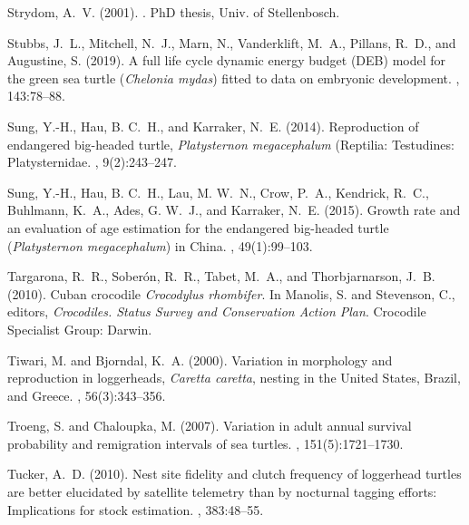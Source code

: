 \documentclass{article}
\begin{document}
\begin{thebibliography}{}
Strydom, A.~V. (2001).
.
\newblock PhD thesis, Univ. of Stellenbosch.

Stubbs, J.~L., Mitchell, N.~J., Marn, N., Vanderklift, M.~A., Pillans, R.~D.,
  and Augustine, S. (2019).
\newblock A full life cycle dynamic energy budget ({D}{E}{B}) model for the
  green sea turtle (\emph{Chelonia mydas}) fitted to data on embryonic
  development.
, 143:78--88.

Sung, Y.-H., Hau, B. C.~H., and Karraker, N.~E. (2014).
\newblock Reproduction of endangered big-headed turtle, \emph{Platysternon
  megacephalum} ({R}eptilia: {T}estudines: {P}latysternidae.
, 9(2):243--247.

Sung, Y.-H., Hau, B. C.~H., Lau, M. W.~N., Crow, P.~A., Kendrick, R.~C.,
  Buhlmann, K.~A., Ades, G. W.~J., and Karraker, N.~E. (2015).
\newblock Growth rate and an evaluation of age estimation for the endangered
  big-headed turtle (\emph{Platysternon megacephalum}) in {C}hina.
, 49(1):99--103.

Targarona, R.~R., Sober\'{o}n, R.~R., Tabet, M.~A., and Thorbjarnarson, J.~B.
  (2010).
\newblock Cuban crocodile \emph{Crocodylus rhombifer}.
\newblock In Manolis, S. and Stevenson, C., editors, {\em Crocodiles. Status
  Survey and Conservation Action Plan}. Crocodile Specialist Group: Darwin.

Tiwari, M. and Bjorndal, K.~A. (2000).
\newblock Variation in morphology and reproduction in loggerheads,
  \textit{Caretta caretta}, nesting in the {U}nited {S}tates, {B}razil, and
  {G}reece.
, 56(3):343--356.

Troeng, S. and Chaloupka, M. (2007).
\newblock Variation in adult annual survival probability and remigration
  intervals of sea turtles.
, 151(5):1721--1730.

Tucker, A.~D. (2010).
\newblock Nest site fidelity and clutch frequency of loggerhead turtles are
  better elucidated by satellite telemetry than by nocturnal tagging efforts:
  Implications for stock estimation.
, 383:48--55.


\end{thebibliography}
\end{document}
